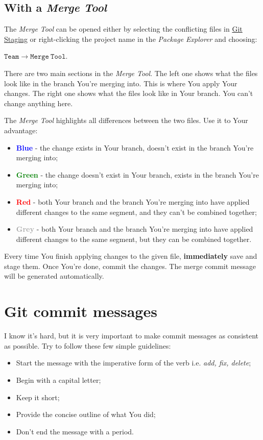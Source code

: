 \documentclass{article}
\begin{document}
\subsection{With a \textit{Merge Tool}}
The \textit{Merge Tool} can be opened either by selecting the conflicting files in \hyperref[sec:git_staging]{Git Staging} or right-clicking the project name in the \textit{Package Explorer} and choosing:\newline

$\mathtt{Team \rightarrow Merge\ Tool}$.\newline

There are two main sections in the \textit{Merge Tool}. The left one shows what the files look like in the branch You're merging into. This is where You apply Your changes. The right one shows what the files look like in Your branch. You can't change anything here.	

The \textit{Merge Tool} highlights all differences between the two files. Use it to Your advantage:
\begin{itemize}
	\item \textbf{\textcolor{blue}{Blue}} - the change exists in Your branch, doesn't exist in the branch You're merging into;
	\item \textbf{\textcolor{green}{Green}} - the change doesn't exist in Your branch, exists in the branch You're merging into;
	\item \textbf{\textcolor{red}{Red}} - both Your branch and the branch You're merging into have applied different changes to the same segment, and they can't be combined together;
	\item \textbf{\textcolor{darkgray}{Grey}} - both Your branch and the branch You're merging into have applied different changes to the same segment, but they can be combined together. 
\end{itemize}

Every time You finish applying changes to the given file, \textbf{immediately} save and stage them. Once You're done, commit the changes. The merge commit message will be generated automatically.

\section{Git commit messages}
\label{sec:commit_messages}
I know it's hard, but it is very important to make commit messages as consistent as possible. Try to follow these few simple guidelines: 
\begin{itemize}
    \item Start the message with the imperative form of the verb i.e. \textit{add, fix, delete};
    \item Begin with a capital letter; 
    \item Keep it short;
    \item Provide the concise outline of what You did;
    \item Don't end the message with a period. 
\end{itemize}
\end{document}
